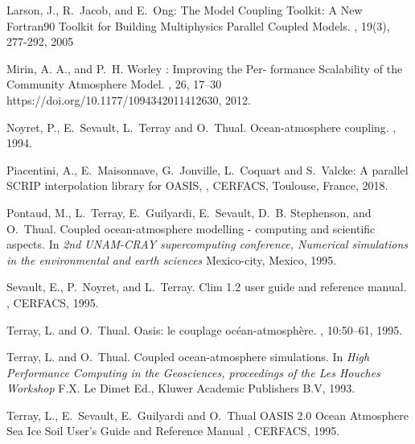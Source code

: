 \begin{thebibliography}{10}
Larson, J., R.~Jacob, and E.~Ong:
\newblock The Model Coupling Toolkit: A New Fortran90 Toolkit for Building Multiphysics Parallel Coupled Models.
, 19(3), 277-292, 2005

Mirin, A. A., and P.~H. Worley : 
\newblock Improving the Per- formance Scalability of the Community Atmosphere Model.
, 26, 17–30
\newblock https://doi.org/10.1177/1094342011412630, 2012.

Noyret, P., E.~Sevault, L.~Terray and O.~Thual.
\newblock Ocean-atmosphere coupling. 
,
1994.

Piacentini, A., E.~Maisonnave, G.~Jonville, L.~Coquart and S.~Valcke:
\newblock A parallel SCRIP interpolation library for OASIS, 
,  
\newblock CERFACS, Toulouse, France, 2018.

Pontaud, M., L.~Terray, E.~Guilyardi, E.~Sevault, D.~B. Stephenson, and
  O.~Thual.
\newblock Coupled ocean-atmosphere modelling - computing and scientific
  aspects.
\newblock In {\em 2nd UNAM-CRAY supercomputing conference, Numerical
  simulations in the environmental and earth sciences}
\newblock Mexico-city, Mexico, 1995.

Sevault, E., P.~Noyret, and L.~Terray.
\newblock Clim 1.2 user guide and reference manual.
, CERFACS, 1995.

Terray, L. and O.~Thual.
\newblock Oasis: le couplage oc\'ean-atmosph\`ere.
, 10:50--61, 1995.

Terray, L. and O.~Thual.
\newblock Coupled ocean-atmosphere simulations. 
\newblock In {\em High Performance Computing in the Geosciences,
proceedings of the Les Houches Workshop}
\newblock F.X. Le Dimet Ed., Kluwer Academic Publishers B.V, 1993.

Terray, L., E.~Sevault, E.~Guilyardi and O.~Thual
\newblock OASIS 2.0 Ocean Atmosphere Sea Ice Soil User's Guide and Reference Manual
, CERFACS, 1995.


\end{thebibliography}
